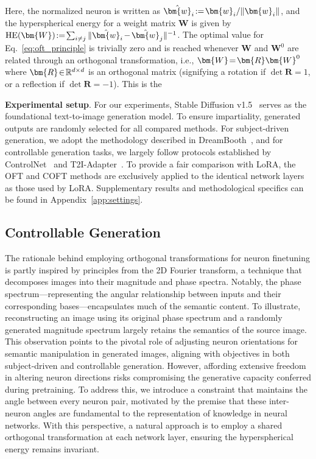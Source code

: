Here, the normalized neuron is written as $\thickmuskip=2mu \medmuskip=2mu \hat{\bm{w}}_i:=\bm{w}_i/\|\bm{w}_i\|$, and the hyperspherical energy for a weight matrix $\bm{W}$ is given by $\thickmuskip=2mu \medmuskip=2mu \text{HE}(\bm{W}):= \sum_{i\neq j} \|\hat{\bm{w}}_i-\hat{\bm{w}}_j\|^{-1}$. The optimal value for Eq.~\eqref{eq:oft_principle} is trivially zero and is reached whenever $\bm{W}$ and $\bm{W}^0$ are related through an orthogonal transformation, i.e., $\thickmuskip=2mu \medmuskip=2mu \bm{W}=\bm{R}\bm{W}^0$ where $\thickmuskip=2mu \medmuskip=2mu \bm{R}\in\mathbb{R}^{d\times d}$ is an orthogonal matrix (signifying a rotation if $\det \bm{R}=1$, or a reflection if $\det \bm{R}=-1$). This is the

\textbf{Experimental setup}. For our experiments, Stable Diffusion v1.5~\cite{rombach2022high} serves as the foundational text-to-image generation model. To ensure impartiality, generated outputs are randomly selected for all compared methods. For subject-driven generation, we adopt the methodology described in DreamBooth~\cite{ruiz2023dreambooth}, and for controllable generation tasks, we largely follow protocols established by ControlNet~\cite{zhang2023adding} and T2I-Adapter~\cite{mou2023t2i}. To provide a fair comparison with LoRA, the OFT and COFT methods are exclusively applied to the identical network layers as those used by LoRA. Supplementary results and methodological specifics can be found in Appendix~\ref{app:settings}.

\subsection{Controllable Generation}

The rationale behind employing orthogonal transformations for neuron finetuning is partly inspired by principles from the 2D Fourier transform, a technique that decomposes images into their magnitude and phase spectra. Notably, the phase spectrum—representing the angular relationship between inputs and their corresponding bases—encapsulates much of the semantic content. To illustrate, reconstructing an image using its original phase spectrum and a randomly generated magnitude spectrum largely retains the semantics of the source image. This observation points to the pivotal role of adjusting neuron orientations for semantic manipulation in generated images, aligning with objectives in both subject-driven and controllable generation. However, affording extensive freedom in altering neuron directions risks compromising the generative capacity conferred during pretraining. To address this, we introduce a constraint that maintains the angle between every neuron pair, motivated by the premise that these inter-neuron angles are fundamental to the representation of knowledge in neural networks. With this perspective, a natural approach is to employ a shared orthogonal transformation at each network layer, ensuring the hyperspherical energy remains invariant.

